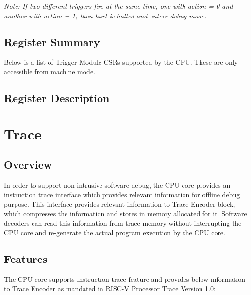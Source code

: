 \documentclass[main\_\_EN.tex]{subfiles}
\begin{document}
\textit{Note: If two different triggers fire at the same time, one with action = 0 and another with action = 1, then hart is halted and enters debug mode.}


\hypertarget{riscvcpu-hwt-reg-summ}{}
\subsection{Register Summary}
\label{sec:riscvcpu-hwt-reg-summ}


Below is a list of Trigger Module CSRs supported by the CPU. These are only accessible from machine mode.




\subsection{Register Description}





\clearpage
\section{Trace}
\label{sec:riscvcpu-trace}

\subsection{Overview}
\label{sec:riscvcpu-trace-overview}
In order to support non-intrusive software debug, the CPU core provides an instruction trace interface which provides relevant information for offline debug purpose. This interface provides relevant information to Trace Encoder block, which compresses the information and stores in memory allocated for it. Software decoders can read this information from trace memory without interrupting the CPU core and re-generate the actual program execution by the CPU core.


\subsection{Features}
\label{sec:riscvcpu-trace-features}

The CPU core supports instruction trace feature and provides below information to Trace Encoder as mandated in RISC-V Processor Trace Version 1.0:
\end{document}
